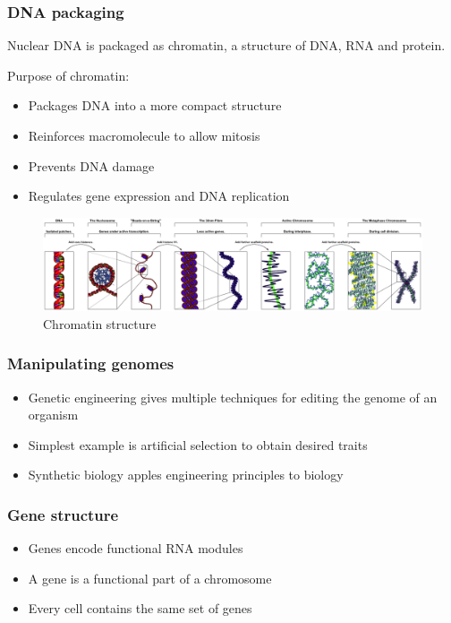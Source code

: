 \documentclass[a4paper]{article}
\begin{document}
\subsubsection{DNA packaging}

Nuclear DNA is packaged as chromatin, a structure of DNA, RNA and protein.

Purpose of chromatin:
\begin{itemize}
  \item Packages DNA into a more compact structure
  \item Reinforces macromolecule to allow mitosis
  \item Prevents DNA damage
  \item Regulates gene expression and DNA replication
\end{itemize}

\begin{figure}[h!]
  \centering
  \includegraphics[width=\textwidth]{graphics/chromatin_structures.eps}
  \caption{Chromatin structure}
  \label{fig:chromatin_structures}
\end{figure}
\FloatBarrier

\subsubsection{Manipulating genomes}

\begin{itemize}
  \item Genetic engineering gives multiple techniques for editing the genome of
        an organism
  \item Simplest example is artificial selection to obtain desired traits
  \item Synthetic biology apples engineering principles to biology
\end{itemize}

\subsubsection{Gene structure}

\begin{itemize}
  \item Genes encode functional RNA modules
  \item A gene is a functional part of a chromosome
  \item Every cell contains the same set of genes
\end{itemize}
\end{document}
